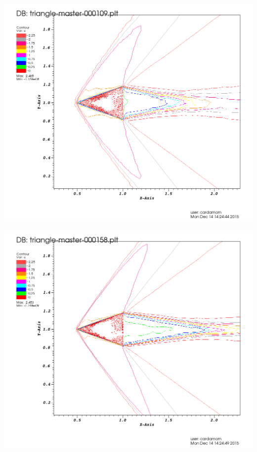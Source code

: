 \begingroup
	\begin{minipage}[t]{.5\linewidth}
		\centering
		\includegraphics[scale=.2]{Bordeaux/figures/AdapPhysique/Contour4bI0.png}
	\end{minipage}
	\hfill
	\begin{minipage}[t]{.5\linewidth}
		\centering
		\includegraphics[scale=.2]{Bordeaux/figures/AdapPhysique/Contour4bI1.png}
	\end{minipage}
